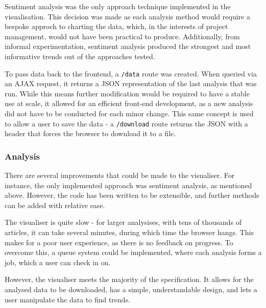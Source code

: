 Sentiment analysis was the only approach technique implemented in the visualisation. This decision was made as each analysis method would require a bespoke approch to charting the data, which, in the interests of project management, would not have been practical to produce. Additionally, from informal experimentation, sentiment analysis produced the strongest and most informative trends out of the approaches tested.

To pass data back to the frontend, a \texttt{/data} route was created. When queried via an AJAX request, it returns a JSON representation of the last analysis that was run. While this means further modification would be required to have a stable use at scale, it allowed for an efficient front-end development, as a new analysis did not have to be conducted for each minor change. This same concept is used to allow a user to save the data - a \texttt{/download} route returns the JSON with a header that forces the browser to download it to a file.

\subsubsection{Analysis}
There are several improvements that could be made to the visualiser. For instance, the only implemented approach was sentiment analysis, as mentioned above. However, the code has been written to be extensible, and further methods can be added with relative ease.

The visualiser is quite slow - for larger analysises, with tens of thousands of articles, it can take several minutes, during which time the browser hangs. This makes for a poor user experience, as there is no feedback on progress. To overcome this, a queue system could be implemented, where each analysis forms a job, which a user can check in on.

However, the visualiser meets the majority of the specification. It allows for the analysed data to be downloaded, has a simple, understandable design, and lets a user manipulate the data to find trends.